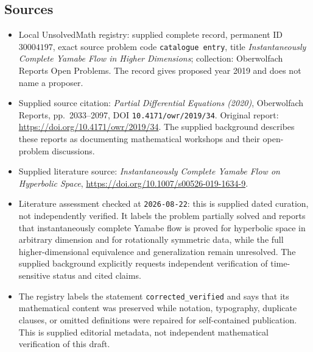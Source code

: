 \documentclass[11pt]{article}
\begin{document}
\subsection{Sources}
\begin{itemize}
\item Local UnsolvedMath registry: supplied complete record, permanent ID \(30004197\), exact source problem code \texttt{catalogue entry}, title \emph{Instantaneously Complete Yamabe Flow in Higher Dimensions}; collection: Oberwolfach Reports Open Problems. The record gives proposed year 2019 and does not name a proposer.
\item Supplied source citation: \emph{Partial Differential Equations (2020)}, Oberwolfach Reports, pp.\ 2033--2097, DOI \texttt{10.4171/owr/2019/34}. Original report: \url{https://doi.org/10.4171/owr/2019/34}. The supplied background describes these reports as documenting mathematical workshops and their open-problem discussions.
\item Supplied literature source: \emph{Instantaneously Complete Yamabe Flow on Hyperbolic Space}, \url{https://doi.org/10.1007/s00526-019-1634-9}.
\item Literature assessment checked at \texttt{2026-08-22}: this is supplied dated curation, not independently verified. It labels the problem partially solved and reports that instantaneously complete Yamabe flow is proved for hyperbolic space in arbitrary dimension and for rotationally symmetric data, while the full higher-dimensional equivalence and generalization remain unresolved. The supplied background explicitly requests independent verification of time-sensitive status and cited claims.
\item The registry labels the statement \texttt{corrected\_verified} and says that its mathematical content was preserved while notation, typography, duplicate clauses, or omitted definitions were repaired for self-contained publication. This is supplied editorial metadata, not independent mathematical verification of this draft.
\end{itemize}
\end{document}
